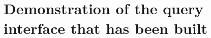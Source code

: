 \documentclass[../main.tex]{subfiles}
\begin{document}
\chapter{Demonstration of the query interface that has been built}
\end{document}
